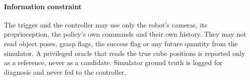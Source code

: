 \paragraph{Information constraint} The trigger and the controller may use only the robot's cameras, its proprioception, the policy's own commands and their own history. They may not read object poses, grasp flags, the success flag or any future quantity from the simulator. A privileged oracle that reads the true cube positions is reported only as a reference, never as a candidate. Simulator ground truth is logged for diagnosis and never fed to the controller.
